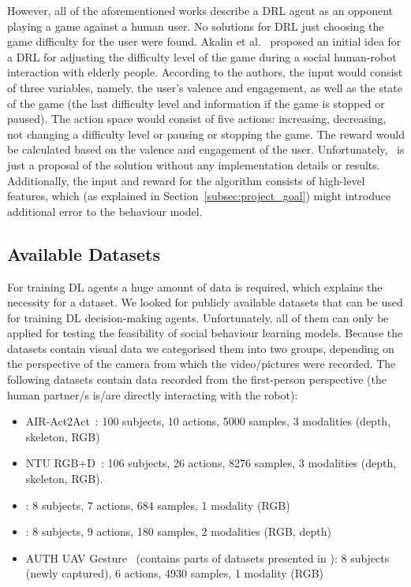 \documentclass[thesis]{mas_proposal}
\begin{document}
However, all of the aforementioned works describe a DRL agent as an opponent playing a game against a human user. No solutions for DRL just choosing the game difficulty for the user were found. Akalin et al.~\cite{Akalin2018} proposed an initial idea for a DRL for adjusting the difficulty level of the game during a social human-robot interaction with elderly people. According to the authors, the input would consist of three variables, namely, the user's valence and engagement, as well as the state of the game (the last difficulty level and information if the game is stopped or paused). The action space would consist of five actions: increasing, decreasing, not changing a difficulty level or pausing or stopping the game. The reward would be calculated based on the valence and engagement of the user. Unfortunately,~\cite{Akalin2018} is just a proposal of the solution without any implementation details or results. Additionally, the input and reward for the algorithm consists of high-level features, which (as explained in Section~\ref{subsec:project_goal}) might introduce additional error to the behaviour model.

\subsection{Available Datasets}
 For training DL agents a huge amount of data is required, which explains the necessity for a dataset. We looked for publicly available datasets that can be used for training DL decision-making agents. Unfortunately, all of them can only be applied for testing the feasibility of social behaviour learning models. Because the datasets contain visual data we categorised them into two groups, depending on the perspective of the camera from which the video/pictures were recorded. The following datasets contain data recorded from the first-person perspective (the human partner/s is/are directly interacting with the robot):
\begin{itemize}
	\item AIR-Act2Act~\cite{Ko2021}: 100 subjects, 10 actions, 5000 samples, 3 modalities (depth, skeleton, RGB)
	\item NTU RGB+D~\cite{Shahroudy_2016_CVPR,Liu2020}: 106 subjects, 26 actions, 8276 samples, 3 modalities (depth, skeleton, RGB).
	\item \cite{ryoo2013firstperson}: 8 subjects, 7 actions, 684 samples, 1 modality (RGB) 
	\item \cite{ryoo2015robot}: 8 subjects, 9 actions, 180 samples, 2 modalities (RGB, depth)
	\item AUTH UAV Gesture~\cite{patrona2021overview} (contains parts of datasets presented in \cite{Shahroudy_2016_CVPR,Perera_2018_ECCV_Workshops}): 8 subjects (newly captured), 6 actions, 4930 samples, 1 modality (RGB) 
\end{itemize}
\end{document}
